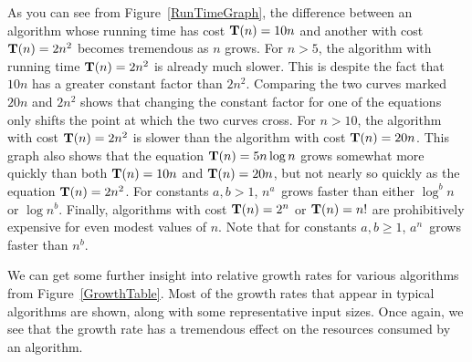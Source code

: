 As you can see from Figure~\ref{RunTimeGraph}, the difference between
an algorithm whose running time has cost \(\mbox{$\textbf{T}(n)$} = 10n\) and another
with cost \(\mbox{$\textbf{T}(n)$} = 2n^2\) becomes tremendous as \(n\) grows.
For \(n > 5\), the algorithm with running time \(\mbox{$\textbf{T}(n)$} = 2n^2\) is
already much slower.
This is despite the fact that \(10n\) has a greater constant factor
than \(2n^2\).
Comparing the two curves marked \(20n\) and \(2n^2\) shows that
changing the constant factor for one of the equations only shifts the
point at which the two curves cross.
For \(n>10\), the algorithm with cost \(\mbox{$\textbf{T}(n)$} = 2n^2\) is slower than
the algorithm with cost \(\mbox{$\textbf{T}(n)$} = 20n\).
This graph also shows that the equation \(\mbox{$\textbf{T}(n)$} = 5 n \log n\)
grows somewhat more quickly than both \(\mbox{$\textbf{T}(n)$} = 10 n\) and
\(\mbox{$\textbf{T}(n)$} = 20 n\), but not nearly so quickly as the equation
\(\mbox{$\textbf{T}(n)$} = 2n^2\). 
For constants \(a, b > 1\), \(n^a\)~grows faster than either
\(\log^b n\) or \(\log n^b\).
Finally, algorithms with cost \(\mbox{$\textbf{T}(n)$} = 2^n\) or \(\mbox{$\textbf{T}(n)$} = n!\) are
prohibitively expensive for even modest values of \(n\).
Note that for constants \(a, b \geq 1\), \(a^n\)~grows faster than
\(n^b\).

We can get some further insight into relative growth rates for various
algorithms from Figure~\ref{GrowthTable}.
Most of the growth rates that appear in typical algorithms are shown,
along with some representative input sizes.
Once again, we see that the growth rate has a tremendous effect on the
resources consumed by an algorithm.

